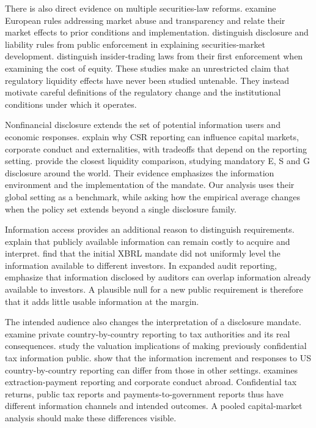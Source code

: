 \documentclass[12pt,letterpaper]{article}
\begin{document}
There is also direct evidence on multiple securities-law reforms. \citet{christensen2016} examine European rules addressing market abuse and transparency and relate their market effects to prior conditions and implementation. \citet{laporta2006} distinguish disclosure and liability rules from public enforcement in explaining securities-market development. \citet{bhattacharya2002} distinguish insider-trading laws from their first enforcement when examining the cost of equity. These studies make an unrestricted claim that regulatory liquidity effects have never been studied untenable. They instead motivate careful definitions of the regulatory change and the institutional conditions under which it operates.


Nonfinancial disclosure extends the set of potential information users and economic responses. \citet{christensen2021} explain why CSR reporting can influence capital markets, corporate conduct and externalities, with tradeoffs that depend on the reporting setting. \citet{krueger2024} provide the closest liquidity comparison, studying mandatory E, S and G disclosure around the world. Their evidence emphasizes the information environment and the implementation of the mandate. Our analysis uses their global setting as a benchmark, while asking how the empirical average changes when the policy set extends beyond a single disclosure family.


Information access provides an additional reason to distinguish requirements. \citet{blankespoor2020} explain that publicly available information can remain costly to acquire and interpret. \citet{blankespoor2014} find that the initial XBRL mandate did not uniformly level the information available to different investors. In expanded audit reporting, \citet{lennox2023} emphasize that information disclosed by auditors can overlap information already available to investors. A plausible null for a new public requirement is therefore that it adds little usable information at the margin.


The intended audience also changes the interpretation of a disclosure mandate. \citet{desimone2022} examine private country-by-country reporting to tax authorities and its real consequences. \citet{muller2024} study the valuation implications of making previously confidential tax information public. \citet{nessa2025} show that the information increment and responses to US country-by-country reporting can differ from those in other settings. \citet{rauter2020} examines extraction-payment reporting and corporate conduct abroad. Confidential tax returns, public tax reports and payments-to-government reports thus have different information channels and intended outcomes. A pooled capital-market analysis should make these differences visible.
\end{document}
